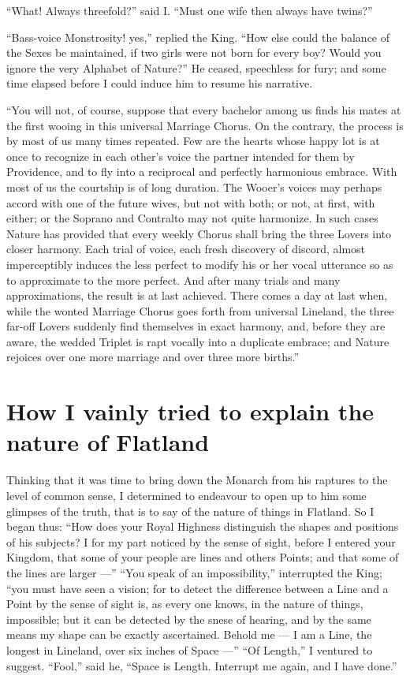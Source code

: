 \documentclass[12pt, a4paper, twoside]{memoir}
\begin{document}
``What! Always threefold?'' said I. ``Must one wife then always have twins?''

``Bass-voice Monstrosity! yes,'' replied the King. ``How else could the balance
of the Sexes be maintained, if two girls were not born for every boy? Would
you ignore the very Alphabet of Nature?'' He ceased, speechless for fury; and
some time elapsed before I could induce him to resume his narrative.

``You will not, of course, suppose that every bachelor among us finds his mates
at the first wooing in this universal Marriage Chorus. On the contrary, the
process is by most of us many times repeated. Few are the hearts whose happy
lot is at once to recognize in each other's voice the partner intended for
them by Providence, and to fly into a reciprocal and perfectly harmonious
embrace. With most of us the courtship is of long duration. The Wooer's voices
may perhaps accord with one of the future wives, but not with both; or not, at
first, with either; or the Soprano and Contralto may not quite harmonize. In
such cases Nature has provided that every weekly Chorus shall bring the three
Lovers into closer harmony. Each trial of voice, each fresh discovery of
discord, almost imperceptibly induces the less perfect to modify his or her
vocal utterance so as to approximate to the more perfect. And after many
trials and many approximations, the result is at last achieved. There comes a
day at last when, while the wonted Marriage Chorus goes forth from universal
Lineland, the three far-off Lovers suddenly find themselves in exact harmony,
and, before they are aware, the wedded Triplet is rapt vocally into a
duplicate embrace; and Nature rejoices over one more marriage and over three
more births.''




\chapter{How I vainly tried to explain the nature of Flatland}
Thinking that it was time to bring down the Monarch from his raptures to the
level of common sense, I determined to endeavour to open up to him some
glimpses of the truth, that is to say of the nature of things in Flatland. So
I began thus: ``How does your Royal Highness distinguish the shapes and
positions of his subjects? I for my part noticed by the sense of sight, before
I entered your Kingdom, that some of your people are lines and others Points;
and that some of the lines are larger ---'' ``You speak of an impossibility,''
interrupted the King; ``you must have seen a vision; for to detect the
difference between a Line and a Point by the sense of sight is, as every one
knows, in the nature of things, impossible; but it can be detected by the
snese of hearing, and by the same means my shape can be exactly ascertained.
Behold me --- I am a Line, the longest in Lineland, over six inches of Space ---''
``Of Length,'' I ventured to suggest. ``Fool,'' said he, ``Space is Length.
Interrupt me again, and I have done.''
\end{document}
